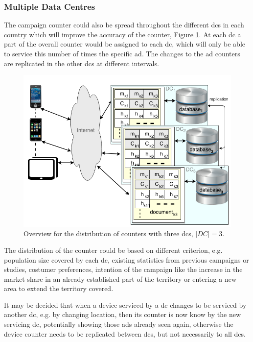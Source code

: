 \subsubsection{Multiple Data Centres}
The campaign counter could also be spread throughout the different \glspl{dc} in each country which will improve the accuracy of the counter, Figure \ref{fig:ads_countert_}. At each \gls{dc} a part of the overall counter would be assigned to each \gls{dc}, which will only be able to service this number of times the specific ad. The changes to the ad counters are replicated in the other \glspl{dc} at different intervals.
\begin{figure}[ht!]
	\centering
	\includegraphics[width=1\linewidth]{figures/AdsServiceSpread2DCs.png}

	\caption{Overview for the distribution of counters with three \glspl{dc}, $|DC| = 3$.}
	\label{fig:ads_countert_}
\end{figure}

The distribution of the counter could be based on different criterion, e.g. population size covered by each \gls{dc}, existing statistics from previous campaigns or studies, costumer preferences, intention of the campaign like the increase in the market share in an already established part of the territory or entering a new area to extend the territory covered.

It may be decided that when a device serviced by a \gls{dc} changes to be serviced by another \gls{dc}, e.g. by changing location, then its counter is now know by the new servicing \gls{dc}, potentially showing those ads already seen again, otherwise the device counter needs to be replicated between \glspl{dc}, but not necessarily to all \glspl{dc}.

